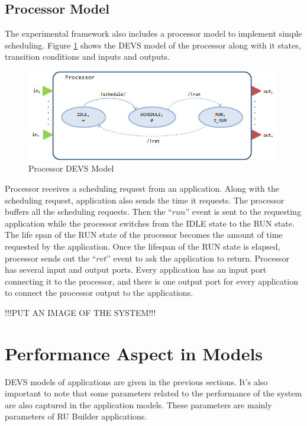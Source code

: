 \subsection{Processor Model}
The experimental framework also includes a processor model to implement simple scheduling. Figure \ref{fig:Processor} shows the DEVS model of the processor along with it states, transition conditions and inputs and outputs.


\begin{figure}
	\centering
		\includegraphics[width=0.99\textwidth]{figures/Processor.png}
	\caption{Processor DEVS Model}
	\label{fig:Processor}
\end{figure}

Processor receives a scheduling request from an application. Along with the scheduling request, application also sends the time it requests. The processor buffers all the scheduling requests. Then the ``$run$'' event is sent to the requesting application while the processor switches from the IDLE state to the RUN state. The life span of the RUN state of the processor becomes the amount of time requested by the application. Once the lifespan of the RUN state is elapsed, processor sends out the ``$ret$'' event to ask the application to return. Processor has several input and output ports. Every application has an input port connecting it to the processor, and there is one output port for every application to connect the processor output to the applications.


!!!PUT AN IMAGE OF THE SYSTEM!!!

\section{Performance Aspect in Models}
DEVS models of applications are given in the previous sections. It's also important to note that some parameters related to the performance of the system are also captured in the application models. These parameters are mainly parameters of RU Builder applications. 


